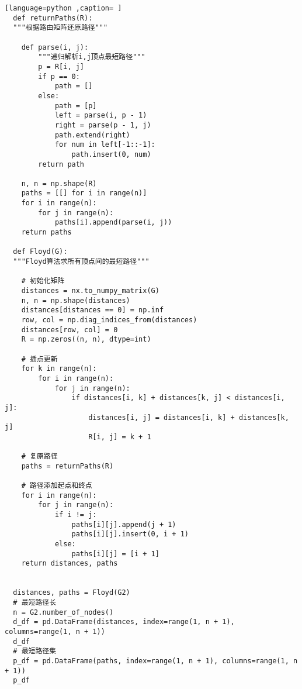 \documentclass[withoutpreface]{cumcmthesis}
\begin{document}
  \begin{lstlisting}[language=python ,caption= ]
  def returnPaths(R):
  """根据路由矩阵还原路径"""

    def parse(i, j):
        """递归解析i,j顶点最短路径"""
        p = R[i, j]
        if p == 0:
            path = []
        else:
            path = [p]
            left = parse(i, p - 1)
            right = parse(p - 1, j)
            path.extend(right)
            for num in left[-1::-1]:
                path.insert(0, num)
        return path

    n, n = np.shape(R)
    paths = [[] for i in range(n)]
    for i in range(n):
        for j in range(n):
            paths[i].append(parse(i, j))
    return paths

  def Floyd(G):
  """Floyd算法求所有顶点间的最短路径"""

    # 初始化矩阵
    distances = nx.to_numpy_matrix(G)
    n, n = np.shape(distances)
    distances[distances == 0] = np.inf
    row, col = np.diag_indices_from(distances)
    distances[row, col] = 0
    R = np.zeros((n, n), dtype=int)

    # 插点更新
    for k in range(n):
        for i in range(n):
            for j in range(n):
                if distances[i, k] + distances[k, j] < distances[i, j]:
                    distances[i, j] = distances[i, k] + distances[k, j]
                    R[i, j] = k + 1

    # 复原路径
    paths = returnPaths(R)

    # 路径添加起点和终点
    for i in range(n):
        for j in range(n):
            if i != j:
                paths[i][j].append(j + 1)
                paths[i][j].insert(0, i + 1)
            else:
                paths[i][j] = [i + 1]
    return distances, paths


  distances, paths = Floyd(G2)
  # 最短路径长
  n = G2.number_of_nodes()
  d_df = pd.DataFrame(distances, index=range(1, n + 1), columns=range(1, n + 1))
  d_df
  # 最短路径集
  p_df = pd.DataFrame(paths, index=range(1, n + 1), columns=range(1, n + 1))
  p_df
  \end{lstlisting}
\end{document}
